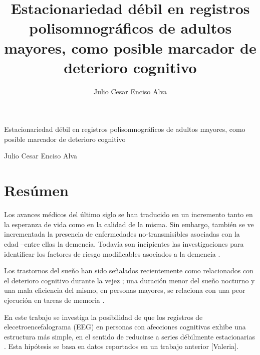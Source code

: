 \documentclass[12pt,a4paper]{mitthesis}
\begin{document}

\setcounter{page}{0}
\thispagestyle{empty}

\title{Estacionariedad d\'ebil en registros polisomnogr\'aficos de adultos mayores,
como posible marcador de deterioro cognitivo}
%
\author{Julio Cesar Enciso Alva}

\begin{center}
\huge{Estacionariedad d\'ebil en registros polisomnogr\'aficos de adultos mayores,
como posible marcador de deterioro cognitivo}


\Large{Julio Cesar Enciso Alva}
\end{center}

\newpage


\setcounter{page}{1}

\chapter*{Res\'umen}

Los avances m\'edicos del \'ultimo siglo se han traducido en un incremento tanto en la esperanza
de vida como en la calidad de la misma. Sin embargo, tambi\'en se ve incrementada la presencia
de enfermedades no-transmisibles asociadas con la edad --entre ellas la demencia.
Todav\'ia son incipientes las investigaciones para identificar los factores de riesgo 
modificables asociados a la demencia \cite{PlanAlzheimer04}.

Los trastornos del sue\~no han sido se\~nalados recientemente como relacionados con el deterioro 
cognitivo durante la vejez \cite{Amer13,Miyata13,Potvin12}; una duraci\'on menor del sue\~no 
nocturno y una mala eficiencia del mismo, en personas mayores, se relaciona con una peor 
ejecuci\'on en tareas de memoria \cite{Reid06}. 

En este trabajo se investiga la posibilidad de que los registros de elecetroencefalograma (EEG) 
en personas con afecciones cognitivas exhibe una estructura m\'as simple, en el sentido de
reducirse a series d\'ebilmente estacionarias \cite{McEwen75,Cohen77,Sugimoto78,Kawabata73}. 
Esta hip\'otesis se basa en datos reportados en un trabajo anterior [Valeria]. 
\end{document}
